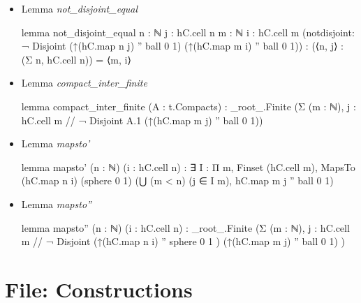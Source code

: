 \documentclass[colorinlistoftodos]{article}
\newcommand{\todonoturgent}[1]{\todo[color=yellow]{#1}}
\begin{document}
\begin{itemize}
  \item Lemma \emph{not\_disjoint\_equal}
\begin{leancode}
lemma not_disjoint_equal {n : ℕ} {j : hC.cell n} {m : ℕ} {i : hC.cell m}
(notdisjoint: ¬ Disjoint (↑(hC.map n j) '' ball 0 1) (↑(hC.map m i) '' ball 0 1)) :
  (⟨n, j⟩ : (Σ n, hC.cell n)) = ⟨m, i⟩
\end{leancode}
  \item Lemma \emph{compact\_inter\_finite} 
\begin{leancode}
lemma compact_inter_finite (A : t.Compacts) : 
  _root_.Finite (Σ (m : ℕ), {j : hC.cell m // ¬ Disjoint A.1 (↑(hC.map m j) '' ball 0 1)})
\end{leancode}
  \item Lemma \emph{mapsto'}
\begin{leancode}
lemma mapsto' (n : ℕ) (i : hC.cell n) : ∃ I : Π m, Finset (hC.cell m),
  MapsTo (hC.map n i) (sphere 0 1) (⋃ (m < n) (j ∈ I m), hC.map m j '' ball 0 1)
\end{leancode}
  \item Lemma \emph{mapsto''} \todonoturgent{Do the proof.}
\begin{leancode}
lemma mapsto'' (n :  ℕ) (i : hC.cell n) : _root_.Finite (Σ (m : ℕ), 
{j : hC.cell m // ¬ Disjoint (↑(hC.map n i) '' sphere 0 1 ) (↑(hC.map m j) '' ball 0 1)} )
\end{leancode}
\end{itemize}

\section{File: Constructions}
\end{document}

